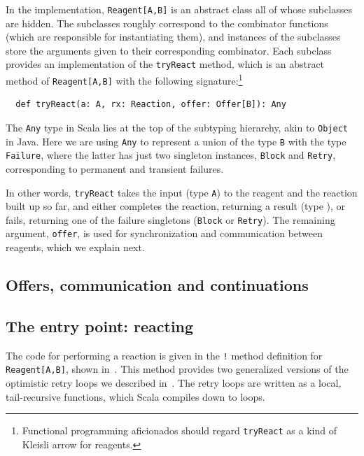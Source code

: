 \documentclass[preprint,nocopyrightspace]{sigplanconf}
\begin{document}
In the implementation, \lstinline{Reagent[A,B]} is an abstract class all of
whose subclasses are hidden.  The subclasses roughly correspond to the
combinator functions (which are responsible for instantiating them), and
instances of the subclasses store the arguments given to their corresponding
combinator.  Each subclass provides an implementation of the
\lstinline{tryReact} method, which is an abstract method of
\lstinline{Reagent[A,B]} with the following signature:\footnote{ Functional
  programming aficionados should regard \lstinline{tryReact} as a kind of
  Kleisli arrow for reagents.}
\begin{lstlisting}
  def tryReact(a: A, rx: Reaction, offer: Offer[B]): Any
\end{lstlisting}
The \lstinline{Any} type in Scala lies at the top of the subtyping hierarchy,
akin to \lstinline{Object} in Java.  Here we are using \lstinline{Any} to
represent a union of the type \lstinline{B} with the type
\lstinline{Failure}, where the latter has just two singleton instances,
\lstinline{Block} and \lstinline{Retry}, corresponding to permanent and
transient failures.  

In other words, \lstinline{tryReact} takes the input (type \lstinline{A}) to
the reagent and the reaction built up so far, and either completes the
reaction, returning a result (type ), or fails, returning one of
the failure singletons (\lstinline{Block} or \lstinline{Retry}).  The
remaining argument, \lstinline{offer}, is used for synchronization and
communication between reagents, which we explain next.

\subsection{Offers, communication and continuations}
\label{sec:offers}

\subsection{The entry point: reacting}
\label{sec:impl-reaction}

The code for performing a reaction is given in the \lstinline{!} method
definition for \lstinline{Reagent[A,B]}, shown in~.  This
method provides two generalized versions of the optimistic retry loops we
described in~.  The retry loops are written as a local,
tail-recursive functions, which Scala compiles down to loops.
\end{document}
